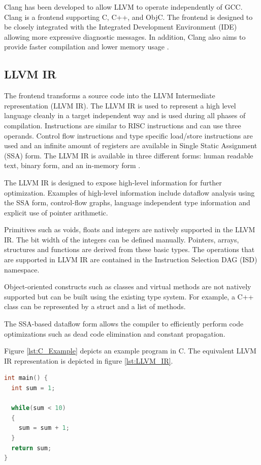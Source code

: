 Clang has been developed to allow LLVM to operate independently of GCC. Clang is a frontend supporting C, C++, and ObjC. The frontend is designed to be closely integrated with the Integrated Development Environment (IDE) allowing more expressive diagnostic messages. In addition, Clang also aims to provide faster compilation and lower memory usage \cite{clang:features}.

\subsection{LLVM IR}
The frontend transforms a source code into the LLVM Intermediate representation (LLVM IR). The LLVM IR is used to represent a high level language cleanly in a target independent way and is used during all phases of compilation. Instructions are similar to RISC instructions and can use three operands. Control flow instructions and type specific load/store instructions are used and an infinite amount of registers are available in Single Static Assignment (SSA) form. The LLVM IR is available in three different forms: human readable text, binary form, and an in-memory form \cite{llvm:presentation}.

The LLVM IR is designed to expose high-level information for further optimization. Examples of high-level information include dataflow analysis using the SSA form, control-flow graphs, language independent type information and explicit use of pointer arithmetic. 

Primitives such as voids, floats and integers are natively supported in the LLVM IR. The bit width of the integers can be defined manually. Pointers, arrays, structures and functions are derived from these basic types. The operations that are supported in LLVM IR are contained in the Instruction Selection DAG (ISD) namespace.

Object-oriented constructs such as classes and virtual methods are not natively supported but can be built using the existing type system. For example, a C++ class can be represented by a struct and a list of methods. 

The SSA-based dataflow form allows the compiler to efficiently perform code optimizations such as dead code elimination and constant propagation. 

Figure \ref{lst:C_Example} depicts an example program in C. The equivalent LLVM IR representation is depicted in figure \ref{lst:LLVM_IR}.

\lstset{numbers=none, captionpos=b}
\begin{lstlisting}[language=C,caption={C example program},label=lst:C_Example]
int main() {
  int sum = 1;

  while(sum < 10)
  {
    sum = sum + 1;
  }
  return sum;
}
\end{lstlisting}


